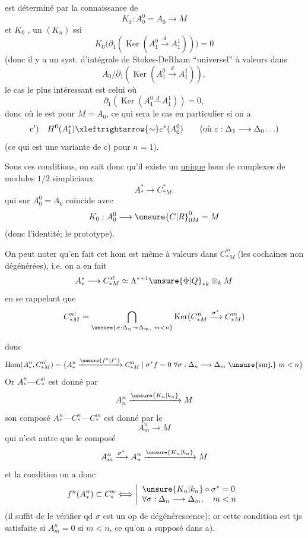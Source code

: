 
est déterminé par la connaissance de
\[
K_0:A_0^0=A_0\longrightarrow M
\]
et $K_0$ , un $(K_n)$  ssi
\[
K_0\bigl(\partial_1(\operatorname{Ker}(A_1^0\xrightarrow{d}A_1^1))\bigr)=0
\]
(donc il y a un syst. d'intégrale de Stokes-DeRham ``universel'' à valeurs dans
\[
A_0/\partial_1(\operatorname{Ker}(A_1^0\xrightarrow{d}A_1^1)),
\]
le cas le plus intéressant est celui où
\[
\partial_1(\operatorname{Ker}(A_1^0\overset{d}{\text{---}}A_1^1))=0,
\]
donc où le  est pour $M=A_0$, ce qui sera le cas en particulier si on a
\[
\mathrm{c}')\quad H^0(A_1^*)\xleftrightarrow{\sim}\varepsilon^*(A_0^0)
\qquad(\text{où }\varepsilon:\Delta_1\longrightarrow\Delta_0\ldots)
\]
(ce qui est une variante de c) pour $n=1$).


Sous ces conditions, on sait donc qu'il existe un \uline{unique} hom de complexes de modules $1/2$ simpliciaux
\[
A_*^*\longrightarrow C_{*M}^*.
\]
qui sur $A_0^0=A_0$ coïncide avec
\[
K_0:A_0^0\longrightarrow \unsure{C|R}_{0M}^0=M
\]
(donc l'identité; le  prototype).

On peut noter qu'en fait cet hom est même à valeurs dans $C_{*M}^{*!}$ (les cochaines non dégénérées), i.e. on a en fait
\[
A_*^*\longrightarrow C_{*M}^{*!}\simeq
\Lambda^{*+1}\unsure{\Phi|Q}_{*k}\otimes_k M
\]
en se rappelant que
\[
C_{*M}^{n!}=
\bigcap_{\unsure{\sigma:\Delta_n\twoheadrightarrow\Delta_m,\ m<n}}
\operatorname{Ker}(C_{*M}^{n}\xrightarrow{\sigma^*}C_{*M}^{m})
\]


donc
\[
\operatorname{Hom}(A_*^n,C_{*M}^{n!})
=\{A_*^n\xrightarrow{\unsure{f^n|f^*}}C_{*M}^n\mid
\sigma^*f=0\ \forall\sigma:\Delta_n\longrightarrow\Delta_m\
\unsure{\text{surj.}}\ m<n\}
\]
Or $A_*^n\text{---}C_*^n$ est donné par 
\[
A_n^n\xrightarrow{\unsure{K_n|k_n}}M
\]
son composé $A_*^n\text{---}C_*^n\text{---}C_*^m$ est donné par le
\[
A_m^n\longrightarrow M
\]
qui n'est autre que le composé
\[
A_m^n\xrightarrow{\sigma^*}A_n^n\xrightarrow{\unsure{K_n|k_n}}M
\]
et la condition  on a donc
\[
f^n(A_*^n)\subset C_*^n
\Longleftrightarrow
\left|\begin{array}{l}
\unsure{K_n|k_n}\circ\sigma^*=0\\
\forall\sigma:\Delta_n\longrightarrow\Delta_m,\quad m<n
\end{array}\right.
\]
(il suffit de le vérifier qd $\sigma$ est un op de dégénérescence); or cette condition est tjs satisfaite si $A_m^n=0$ si $m<n$, ce qu'on a supposé dans a).

